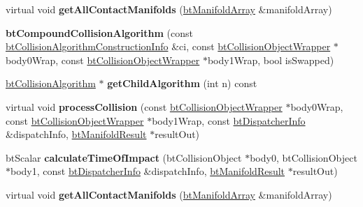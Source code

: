 \begin{DoxyCompactItemize}
\item 
\mbox{\label{classbtCompoundCollisionAlgorithm_a317a7f5e99fca79e6caaa267274ca0dc}} 
virtual void {\bfseries get\+All\+Contact\+Manifolds} (\hyperlink{classbtAlignedObjectArray}{bt\+Manifold\+Array} \&manifold\+Array)
\item 
\mbox{\label{classbtCompoundCollisionAlgorithm_acb81b191f56f62a703723fe32523b505}} 
{\bfseries bt\+Compound\+Collision\+Algorithm} (const \hyperlink{structbtCollisionAlgorithmConstructionInfo}{bt\+Collision\+Algorithm\+Construction\+Info} \&ci, const \hyperlink{structbtCollisionObjectWrapper}{bt\+Collision\+Object\+Wrapper} $\ast$body0\+Wrap, const \hyperlink{structbtCollisionObjectWrapper}{bt\+Collision\+Object\+Wrapper} $\ast$body1\+Wrap, bool is\+Swapped)
\item 
\mbox{\label{classbtCompoundCollisionAlgorithm_af779babe4aaaa78c5d5193693236668e}} 
\hyperlink{classbtCollisionAlgorithm}{bt\+Collision\+Algorithm} $\ast$ {\bfseries get\+Child\+Algorithm} (int n) const
\item 
\mbox{\label{classbtCompoundCollisionAlgorithm_aac14e642099f1c65603c9a47cd5b01aa}} 
virtual void {\bfseries process\+Collision} (const \hyperlink{structbtCollisionObjectWrapper}{bt\+Collision\+Object\+Wrapper} $\ast$body0\+Wrap, const \hyperlink{structbtCollisionObjectWrapper}{bt\+Collision\+Object\+Wrapper} $\ast$body1\+Wrap, const \hyperlink{structbtDispatcherInfo}{bt\+Dispatcher\+Info} \&dispatch\+Info, \hyperlink{classbtManifoldResult}{bt\+Manifold\+Result} $\ast$result\+Out)
\item 
\mbox{\label{classbtCompoundCollisionAlgorithm_aa223c7b4af581c9050a7ad20a1309ac0}} 
bt\+Scalar {\bfseries calculate\+Time\+Of\+Impact} (bt\+Collision\+Object $\ast$body0, bt\+Collision\+Object $\ast$body1, const \hyperlink{structbtDispatcherInfo}{bt\+Dispatcher\+Info} \&dispatch\+Info, \hyperlink{classbtManifoldResult}{bt\+Manifold\+Result} $\ast$result\+Out)
\item 
\mbox{\label{classbtCompoundCollisionAlgorithm_a317a7f5e99fca79e6caaa267274ca0dc}} 
virtual void {\bfseries get\+All\+Contact\+Manifolds} (\hyperlink{classbtAlignedObjectArray}{bt\+Manifold\+Array} \&manifold\+Array)
\end{DoxyCompactItemize}
